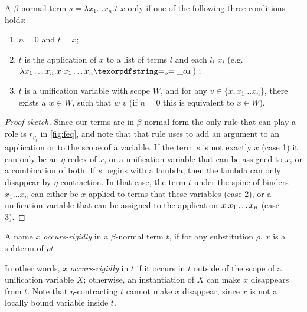 \begin{lemma}\label{lem:reduceto}
A $\beta$-normal term $s = \lambda x_1 \ldots x_n.t$
\reduceto{} $x$ only if one of the following three conditions holds:
\begin{enumerate}
  \item $n = 0$ and $t = x$;
  \item $t$ is the application of $x$ to a list
     of terms $l$ and each $l_i$ \reduceto{} $x_i$
     (e.g. $\lambda x_1 \ldots x_n.x \appsep x_1 \ldots x_n \Eo{} x$) ;
  \item $t$ is a unification variable with scope
    $W$, and for any $v \in \{ x, x_1 \ldots x_n \}$,
    there exists a $w \in W$, such that $w$ \reduceto{} $v$
    (if $n = 0$ this is equivalent to $x \in W$).
\end{enumerate}
\end{lemma}
\begin{proof}[Proof sketch]
Since our terms are in $\beta$-normal form the only
rule that can play a role is $r_{\eta_l}$ in \cref{fig:feq}, and note that
that rule uses  to add an argument to an
application or to the scope of a variable.
If the term $s$ is not exactly $x$ (case 1)
it can only be an $\eta$-redex of $x$, or a unification
variable that can be assigned to $x$, or a combination of both.
If $s$ begins with a lambda, then the lambda can only disappear by $\eta$
contraction. In that case, the term $t$ under the spine of binders
$x_1\ldots x_n$ can either be $x$ applied to terms that
\reduceto{} these variables (case 2), or a unification variable
that can be assigned to the application $x \appsep x_1 \ldots x_n$ (case 3).
\end{proof}


\newcommand{\occursrigid}{\emph{occurs-rigidly}\xspace}
\newcommand{\occurrigid}{\emph{occur-rigidly}\xspace}
\begin{definition}[\occursrigid]\label{def:occrigid}
  A name $x$ \occursrigid{} in a $\beta$-normal term $t$, if for any substitution
  $\rho$, $x$ is a subterm of $\rho t$
\end{definition}

In other words, $x$ \occursrigid in $t$ if it occurs in $t$
outside of the scope of a unification variable $X$; otherwise, an instantiation
of $X$ can make $x$ disappears from $t$.
Note that $\eta$-contracting $t$ cannot make $x$ disappear, since
$x$ is not a locally bound variable inside $t$.


